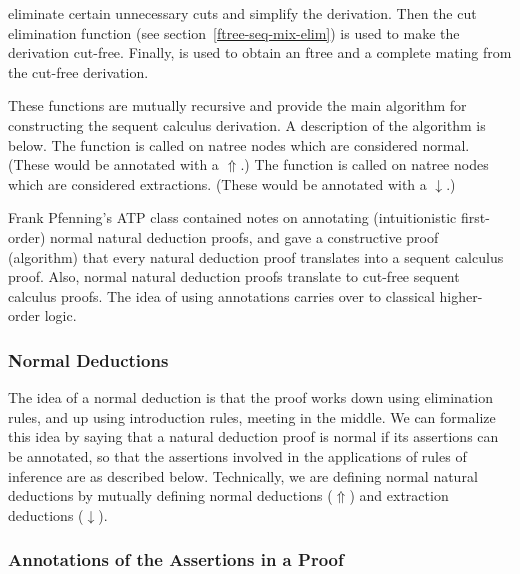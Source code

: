 \begin{description}
eliminate certain unnecessary cuts and simplify the derivation.
Then the cut elimination function 
(see section~\ref{ftree-seq-mix-elim})
is used to make the derivation cut-free.
Finally,  is used to obtain
an ftree and a complete mating from the cut-free derivation.
\item [\indexfunction{natree-to-ftree-seq-normal}, \indexfunction{natree-to-ftree-seq-extraction}]
These 
functions are mutually recursive and provide the main algorithm for constructing
the sequent calculus derivation.  A description of the algorithm is below.  The function 
is called on natree nodes which are considered normal.  (These would be annotated with a $\Uparrow$.)
The function  is called on natree nodes which
are considered extractions.  (These would be annotated with a $\downarrow$.)
\end{description}

Frank Pfenning's ATP
class contained notes on annotating (intuitionistic first-order)
normal natural deduction proofs, and gave a constructive proof
(algorithm) that every natural deduction proof
translates into a sequent calculus proof.  Also, normal natural deduction proofs
translate to cut-free sequent calculus proofs.
The idea of using annotations carries over to classical higher-order
logic.

\subsubsection{Normal Deductions}

The idea of a normal deduction is that the proof works down
using elimination rules, and up using introduction rules,
meeting in the middle.  We can formalize this idea by saying that
a natural deduction proof is normal if its assertions can be annotated,
so that the assertions involved in the applications of rules of inference
are as described below.
Technically, we are defining normal natural deductions by mutually
defining normal deductions ($\Uparrow$) and extraction deductions ($\downarrow$).

\subsubsection{Annotations of the Assertions in a Proof}

